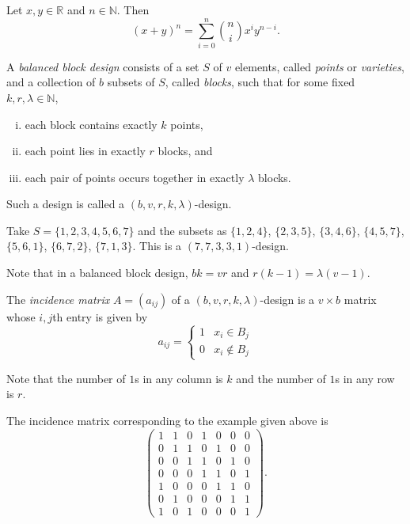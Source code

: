 \begin{theorem}
    Let $x,y\in\mathbb{R}$ and $n\in\mathbb{N}$. Then
    $$(x+y)^n = \sum_{i=0}^n \binom{n}{i}x^iy^{n-i}.$$
\end{theorem}

\begin{definition}
\label{defBalancedBlockDesign}
    A \textit{balanced block design} consists of a set $S$ of $v$ elements, called \textit{points} or \textit{varieties}, and a collection of $b$ subsets of $S$, called \textit{blocks}, such that for some fixed $k,r,\lambda\in\mathbb{N}$,
    \begin{enumerate}[(i)]
        \item each block contains exactly $k$ points,
        \item each point lies in exactly $r$ blocks, and
        \item each pair of points occurs together in exactly $\lambda$ blocks.
    \end{enumerate}
    Such a design is called a $(b,v,r,k,\lambda)$-design.
\end{definition}

\begin{example}
    Take $S=\{1,2,3,4,5,6,7\}$ and the subsets as $\{1,2,4\}$, $\{2,3,5\}$, $\{3,4,6\}$, $\{4,5,7\}$, $\{5,6,1\}$, $\{6,7,2\}$, $\{7,1,3\}$. This is a $(7,7,3,3,1)$-design.
\end{example}

Note that in a balanced block design, $bk=vr$ and $r(k-1)=\lambda(v-1)$.

\begin{definition}
    The \textit{incidence matrix} $A=(a_{ij})$ of a $(b,v,r,k,\lambda)$-design is a $v\times b$ matrix whose $i,j$th entry is given by
    $$
    a_{ij}=
    \begin{cases}
    1 & x_i\in B_j \\
    0 & x_i\not\in B_j
    \end{cases}
    $$
\end{definition}

Note that the number of $1$s in any column is $k$ and the number of $1$s in any row is $r$.

\begin{example}
\label{incidenceMatrixOf77331Des}
    The incidence matrix corresponding to the example given above is
    $$\left(
    \begin{matrix}
    1 & 1 & 0 & 1 & 0 & 0 & 0 \\
    0 & 1 & 1 & 0 & 1 & 0 & 0 \\
    0 & 0 & 1 & 1 & 0 & 1 & 0 \\
    0 & 0 & 0 & 1 & 1 & 0 & 1 \\
    1 & 0 & 0 & 0 & 1 & 1 & 0 \\
    0 & 1 & 0 & 0 & 0 & 1 & 1 \\
    1 & 0 & 1 & 0 & 0 & 0 & 1
    \end{matrix}
    \right).
    $$
\end{example}

